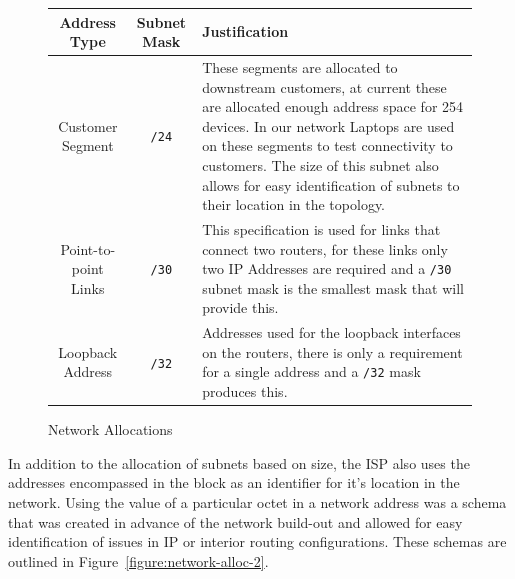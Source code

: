 \begin{figure}[!ht]
    \caption{Network Allocations}
    \label{figure:network-alloc-1}
    \centering
    \begin{tabular}{|c|c|p{5.5cm}|}

        \hline
        \textbf{Address Type} & \textbf{Subnet Mask} & \textbf{Justification} \\

        \hline
        Customer Segment & \texttt{/24} & These segments are allocated to downstream
        customers, at current these are allocated enough address space for 254
        devices. In our network Laptops are used on these segments to test
        connectivity to customers. The size of this subnet also allows for easy
        identification of subnets to their location in the topology.\\

        \hline
        Point-to-point Links & \texttt{/30} & This specification is used for links that
        connect two routers, for these links only two IP Addresses are required
        and a \texttt{/30} subnet mask is the smallest mask that will provide this.\\

        \hline
        Loopback Address & \texttt{/32} & Addresses used for the loopback interfaces on
        the routers, there is only a requirement for a single address and a \texttt{/32}
        mask produces this.\\

        \hline
    \end{tabular}
\end{figure}

In addition to the allocation of subnets based on size, the ISP also uses the
addresses encompassed in the block as an identifier for it's location in the
network. Using the value of a particular octet in a network address was a schema
that was created in advance of the network build-out and allowed for easy
identification of issues in IP or interior routing configurations. These schemas
are outlined in Figure~\ref{figure:network-alloc-2}.

